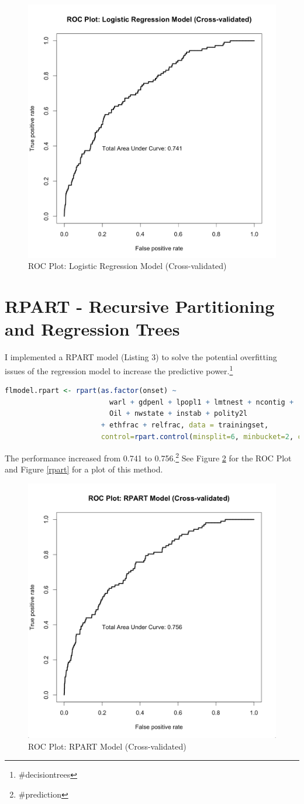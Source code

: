 \documentclass{article}
\begin{document}
\begin{figure}[h!]
    \centering
    \includegraphics[width=0.5\linewidth]{roclr.png}
    \caption{ROC Plot: Logistic Regression Model (Cross-validated)}
    \label{roclr}
\end{figure}


\section{RPART - Recursive Partitioning and Regression Trees}
I implemented a RPART model (Listing 3) to solve the potential overfitting issues of the regression model to increase the predictive power.\footnote{\#decisiontrees}

\begin{lstlisting}[language=R, caption=RPART Model (Cross-Validated)]
flmodel.rpart <- rpart(as.factor(onset) ~ 
                         warl + gdpenl + lpopl1 + lmtnest + ncontig + 
                         Oil + nwstate + instab + polity2l
                       + ethfrac + relfrac, data = trainingset, 
                       control=rpart.control(minsplit=6, minbucket=2, cp=0.003)) #loosing the control for better predictive power
\end{lstlisting}

The performance increased from 0.741 to 0.756.\footnote{\#prediction} See Figure \ref{rocrpart} for the ROC Plot and Figure \ref{rpart} for a plot of this method.

\begin{figure}[h!]
    \centering
    \includegraphics[width=0.5\linewidth]{rocrpart.png}
    \caption{ROC Plot: RPART Model (Cross-validated)}
    \label{rocrpart}
\end{figure}
\end{document}
